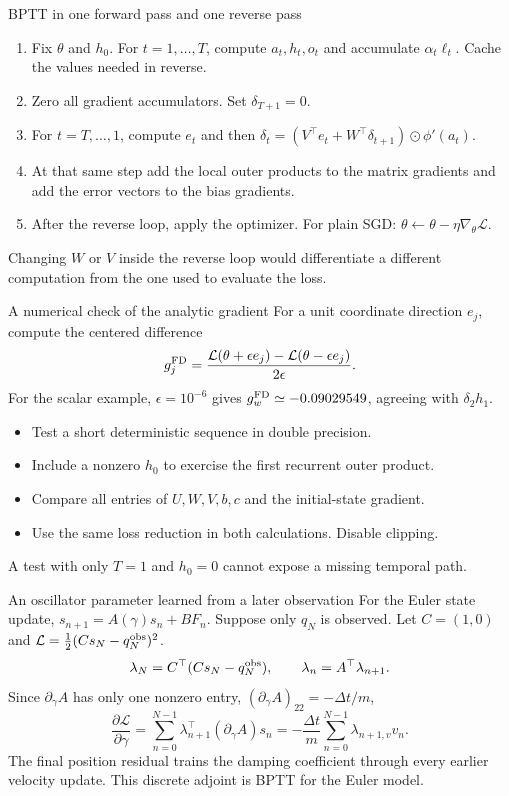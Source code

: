 \documentclass[aspectratio=169,11pt]{beamer}
\begin{document}
\begin{frame}[label=bptt]{BPTT in one forward pass and one reverse pass}
\begin{enumerate}
\item Fix $\theta$ and $h_0$. For $t=1,\ldots,T$, compute $a_t,h_t,o_t$ and
accumulate $\alpha_t\ell_t$. Cache the values needed in reverse.
\item Zero all gradient accumulators. Set $\delta_{T+1}=0$.
\item For $t=T,\ldots,1$, compute $e_t$ and then
$\delta_t=(V^\top e_t+W^\top\delta_{t+1})\odot\phi'(a_t)$.
\item At that same step add the local outer products to the matrix gradients
and add the error vectors to the bias gradients.
\item After the reverse loop, apply the optimizer. For plain SGD:
$\theta\leftarrow\theta-\eta\nabla_\theta\mathcal L$.
\end{enumerate}
Changing $W$ or $V$ inside the reverse loop would differentiate a different
computation from the one used to evaluate the loss.
\end{frame}
\begin{frame}{A numerical check of the analytic gradient}
For a unit coordinate direction $e_j$, compute the centered difference
\[
g^{\rm FD}_j=\frac{\mathcal L(\theta+\epsilon e_j)-
\mathcal L(\theta-\epsilon e_j)}{2\epsilon}.
\]
For the scalar example, $\epsilon=10^{-6}$ gives
$g_w^{\rm FD}\simeq-0.09029549$, agreeing with $\delta_2h_1$.
\begin{itemize}
\item Test a short deterministic sequence in double precision.
\item Include a nonzero $h_0$ to exercise the first recurrent outer product.
\item Compare all entries of $U,W,V,b,c$ and the initial-state gradient.
\item Use the same loss reduction in both calculations. Disable clipping.
\end{itemize}
A test with only $T=1$ and $h_0=0$ cannot expose a missing temporal path.
\end{frame}
\begin{frame}{An oscillator parameter learned from a later observation}
For the Euler state update, $s_{n+1}=A(\gamma)s_n+BF_n$.
Suppose only $q_N$ is observed. Let $C=(1,0)$ and
$\mathcal L=\tfrac12(Cs_N-q_N^{\rm obs})^2$.
\[
\lambda_N=C^\top(Cs_N-q_N^{\rm obs}),\qquad
\lambda_n=A^\top\lambda_{n+1}.
\]
Since $\partial_\gamma A$ has only one nonzero entry,
$(\partial_\gamma A)_{22}=-\Delta t/m$,
\[
\boxed{\frac{\partial\mathcal L}{\partial\gamma}
=\sum_{n=0}^{N-1}\lambda_{n+1}^\top(\partial_\gamma A)s_n
=-\frac{\Delta t}{m}\sum_{n=0}^{N-1}\lambda_{n+1,v}v_n .}
\]
The final position residual trains the damping coefficient through every
earlier velocity update. This discrete adjoint is BPTT for the Euler model.
\end{frame}
\end{document}
